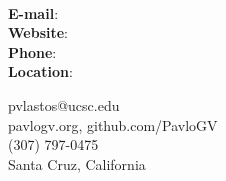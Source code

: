 \documentclass[paper=a4,fontsize=11pt]{article} %
\begin{document}
 

    \noindent
    \begin{minipage}[t]{0.6\linewidth}
    \\
    \end{minipage}
    \begin{minipage}[c]{0.085\linewidth}
    \noindent \textbf{E-mail}:\\
    \noindent \textbf{Website}:\\
    \noindent \textbf{Phone}:\\
    \noindent \textbf{Location}:\\
    \end{minipage}
    \begin{minipage}[c]{0.4\linewidth}
    \noindent pvlastos@ucsc.edu\\
    \noindent pavlogv.org, github.com/PavloGV\\
     (307) 797-0475\\
    \noindent Santa Cruz, California\\
    \end{minipage}
\end{document}
